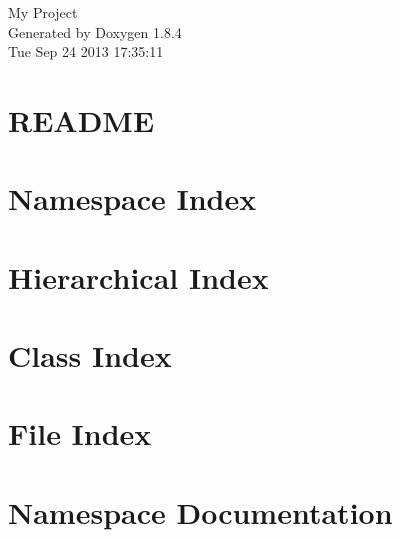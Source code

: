 \documentclass[twoside]{book}
\newcommand{\clearemptydoublepage}{%
  \newpage{\pagestyle{empty}\cleardoublepage}%
}
\begin{document}
\hypersetup{pageanchor=false}
\begin{titlepage}
\vspace*{7cm}
\begin{center}%
{\Large My Project }\\
\vspace*{1cm}
{\large Generated by Doxygen 1.8.4}\\
\vspace*{0.5cm}
{\small Tue Sep 24 2013 17:35:11}\\
\end{center}
\end{titlepage}
\clearemptydoublepage
\tableofcontents
\clearemptydoublepage
{}
\hypersetup{pageanchor=true}

\chapter{R\-E\-A\-D\-M\-E}
\label{md_README}
\hypertarget{md_README}{}

\chapter{Namespace Index}

\chapter{Hierarchical Index}

\chapter{Class Index}

\chapter{File Index}

\chapter{Namespace Documentation}



\end{document}
